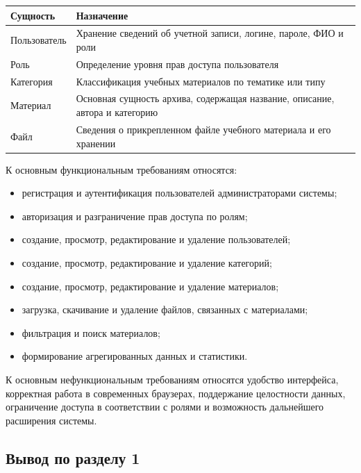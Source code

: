 \documentclass[14pt,a4paper]{extarticle}
\begin{document}
\begin{center}
\begin{tabularx}{0.96\textwidth}{>{\raggedright\arraybackslash}p{3.4cm} >{\raggedright\arraybackslash}X}
\toprule
\textbf{Сущность} & \textbf{Назначение} \\
\midrule
Пользователь & Хранение сведений об учетной записи, логине, пароле, ФИО и роли \\
Роль & Определение уровня прав доступа пользователя \\
Категория & Классификация учебных материалов по тематике или типу \\
Материал & Основная сущность архива, содержащая название, описание, автора и категорию \\
Файл & Сведения о прикрепленном файле учебного материала и его хранении \\
\bottomrule
\end{tabularx}
\end{center}

К основным функциональным требованиям относятся:

\begin{itemize}[leftmargin=1.25cm]
    \item регистрация и аутентификация пользователей администраторами системы;
    \item авторизация и разграничение прав доступа по ролям;
    \item создание, просмотр, редактирование и удаление пользователей;
    \item создание, просмотр, редактирование и удаление категорий;
    \item создание, просмотр, редактирование и удаление материалов;
    \item загрузка, скачивание и удаление файлов, связанных с материалами;
    \item фильтрация и поиск материалов;
    \item формирование агрегированных данных и статистики.
\end{itemize}

К основным нефункциональным требованиям относятся удобство интерфейса, корректная работа в современных браузерах, поддержание целостности данных, ограничение доступа в соответствии с ролями и возможность дальнейшего расширения системы.

\subsection*{Вывод по разделу 1}
\end{document}
